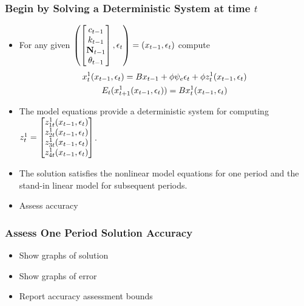 \documentclass[letter]{beamer}
\begin{document}
  




\begin{frame}
  \frametitle{Begin by Solving a Deterministic System at time $t$}
{\small

  \begin{itemize}
  \item For any given $\left (  \begin{bmatrix}
c_{t-1}\\k_{t-1}\\ {\mathbf{N}}_{t-1}\\\theta_{t-1}
  \end{bmatrix}, \epsilon_t \right )=(x_{t-1},\epsilon_t)$ 
compute
  \begin{gather}
    \label{eq:3}
    x_t^1(x_{t-1},\epsilon_t)=B x_{t-1} + \phi \psi_e\epsilon_t + \phi z^1_t(x_{t-1},\epsilon_t)\\
    E_t(x^1_{t+1}(x_{t-1},\epsilon_t))=B x^1_{t}(x_{t-1},\epsilon_t)
  \end{gather}
\item The model equations provide a deterministic system  for computing $  z^1_t=\begin{bmatrix}
    z^1_{1t}(x_{t-1},\epsilon_t)\\
    z^1_{2t}(x_{t-1},\epsilon_t)\\
    z^1_{3t}(x_{t-1},\epsilon_t)\\
    z^1_{4t}(x_{t-1},\epsilon_t)
  \end{bmatrix}$.
\item The solution satisfies the nonlinear model equations for one 
period and the stand-in linear model for subsequent periods.
\item Assess accuracy
  \end{itemize}
}

\end{frame}

\begin{frame}
  \frametitle{Assess One Period Solution Accuracy}
  \begin{itemize}
  \item Show graphs of solution
  \item Show graphs of error
  \item Report accuracy assessment bounds
  \end{itemize}
\end{frame}
\end{document}
